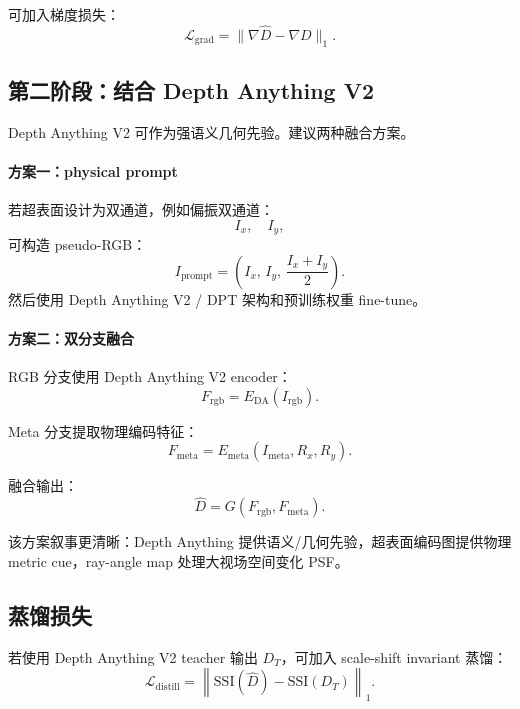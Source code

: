 \documentclass[11pt,a4paper,fontset=none]{ctexart}
\begin{document}
可加入梯度损失：
\begin{equation}
  \mathcal L_{\mathrm{grad}}
  =
  \|\nabla\hat D-\nabla D\|_1.
\end{equation}

\subsection{第二阶段：结合 Depth Anything V2}

Depth Anything V2 可作为强语义几何先验。建议两种融合方案。

\paragraph{方案一：physical prompt}
若超表面设计为双通道，例如偏振双通道：
\begin{equation}
  I_x,\quad I_y,
\end{equation}
可构造 pseudo-RGB：
\begin{equation}
  I_{\mathrm{prompt}}
  =
  \left(
  I_x,\,
  I_y,\,
  \frac{I_x+I_y}{2}
  \right).
\end{equation}
然后使用 Depth Anything V2 / DPT 架构和预训练权重 fine-tune。

\paragraph{方案二：双分支融合}
RGB 分支使用 Depth Anything V2 encoder：
\begin{equation}
  F_{\mathrm{rgb}}=E_{\mathrm{DA}}(I_{\mathrm{rgb}}).
\end{equation}

Meta 分支提取物理编码特征：
\begin{equation}
  F_{\mathrm{meta}}=E_{\mathrm{meta}}(I_{\mathrm{meta}},R_x,R_y).
\end{equation}

融合输出：
\begin{equation}
  \hat D=G(F_{\mathrm{rgb}},F_{\mathrm{meta}}).
\end{equation}

该方案叙事更清晰：Depth Anything 提供语义/几何先验，超表面编码图提供物理 metric cue，ray-angle map 处理大视场空间变化 PSF。

\subsection{蒸馏损失}

若使用 Depth Anything V2 teacher 输出 $D_T$，可加入 scale-shift invariant 蒸馏：
\begin{equation}
  \mathcal L_{\mathrm{distill}}
  =
  \left\|
  \mathrm{SSI}(\hat D)
  -
  \mathrm{SSI}(D_T)
  \right\|_1.
\end{equation}
\end{document}
